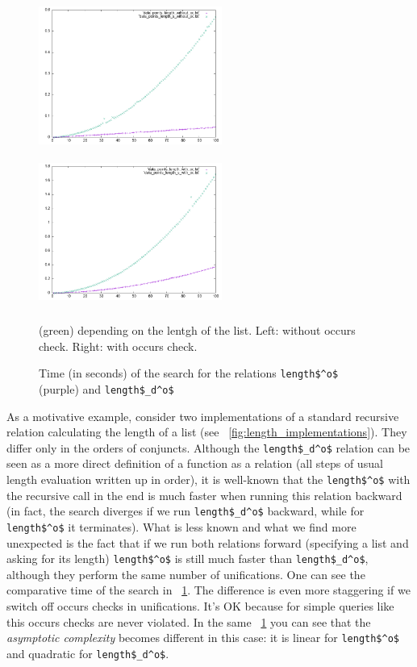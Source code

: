 \begin{figure}[t]
    \includegraphics[width=6cm,height=5cm]{lengths_without_oc.png}
    \includegraphics[width=6cm,height=5cm]{lengths_with_oc.png}
  \caption{Time (in seconds) of the search for the relations \lstinline|length$^o$| (purple) and \lstinline|length$_d^o$|} (green) depending on the lentgh of the list.
  Left: without occurs check.
  Right: with occurs check.
  \label{fig:length_plots}
\end{figure}

As a motivative example, consider two implementations of a standard recursive relation calculating the length of a list (see \figureword~\ref{fig:length_implementations}). They differ only in the
orders of conjuncts. Although the \lstinline|length$_d^o$| relation can be seen as a more direct definition of a function as a relation (all steps of usual length evaluation written up in order),
it is well-known that the \lstinline|length$^o$| with the recursive call in the end is much faster when running this relation backward (in fact, the search diverges if we
run \lstinline|length$_d^o$| backward, while for \lstinline|length$^o$| it terminates). What is less known and what we find more unexpected is the fact that if we run both relations
forward (specifying a list and asking for its length) \lstinline|length$^o$| is still much faster than \lstinline|length$_d^o$|, although they perform the same number of unifications. One can see the comparative time of the search in \figureword~\ref{fig:length_plots}. The difference is even
more staggering if we switch off occurs checks in unifications. It's OK because for simple queries like this occurs checks are never violated. In the same \figureword~\ref{fig:length_plots} you can see that
the \emph{asymptotic complexity} becomes different in this case: it is linear for \lstinline|length$^o$| and quadratic for \lstinline|length$_d^o$|.

